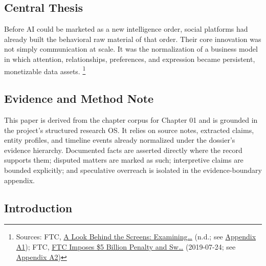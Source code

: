 \documentclass[
  american,
  11pt,
  letterpaper,
]{article}
\begin{document}
\subsection{Central Thesis}\label{central-thesis}

Before AI could be marketed as a new intelligence order, social
platforms had already built the behavioral raw material of that order.
Their core innovation was not simply communication at scale. It was the
normalization of a business model in which attention, relationships,
preferences, and expression became persistent, monetizable data assets.
\footnote{Sources: FTC,
  \href{https://www.ftc.gov/reports/look-behind-screens-examining-data-practices-social-media-video-streaming-services}{A
  Look Behind the Screens: Examining\ldots{}} (n.d.; see
  \hyperref[appendix-a1-a-look-behind-the-screens-examining-the-data-practices-of-social-media-and-video-streaming-services]{Appendix
  A1}); FTC,
  \href{https://www.ftc.gov/news-events/news/press-releases/2019/07/ftc-imposes-5-billion-penalty-sweeping-new-privacy-restrictions-facebook}{FTC
  Imposes \$5 Billion Penalty and Sw\ldots{}} (2019-07-24; see
  \hyperref[appendix-a2-ftc-imposes-5-billion-penalty-and-sweeping-new-privacy-restrictions-on-facebook]{Appendix
  A2})}

\subsection{Evidence and Method Note}\label{evidence-and-method-note}

This paper is derived from the chapter corpus for Chapter 01 and is
grounded in the project's structured research OS. It relies on source
notes, extracted claims, entity profiles, and timeline events already
normalized under the dossier's evidence hierarchy. Documented facts are
asserted directly where the record supports them; disputed matters are
marked as such; interpretive claims are bounded explicitly; and
speculative overreach is isolated in the evidence-boundary appendix.

\subsection{Introduction}\label{introduction}
\end{document}
